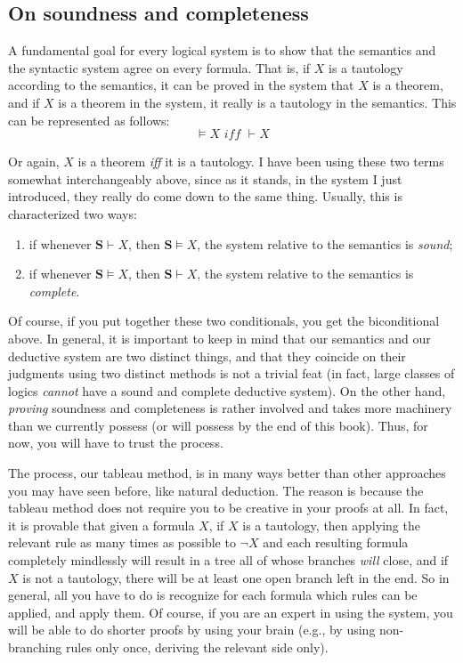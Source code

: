 \subsection{On soundness and completeness}

A fundamental goal for every logical system is to show that the semantics and the syntactic system agree on every formula. That is, if $X$ is a tautology according to the semantics, it can be proved in the system that $X$ is a theorem, and if $X$ is a theorem in the system, it really is a tautology in the semantics. This can be represented as follows: 
\[\models X \textit{ iff } \vdash X\]

Or again, $X$ is a theorem \textit{iff} it is a tautology. I have been using these two terms somewhat interchangeably above, since as it stands, in the system I just introduced, they really do come down to the same thing. Usually, this is characterized two ways:

\begin{enumerate}
	\item if whenever $\mathbf{S} \vdash X$, then $\mathbf{S} \models X$, the system relative to the semantics is \textit{sound};
	\item if whenever $\mathbf{S} \models X$, then $\mathbf{S} \vdash X$, the system relative to the semantics is \textit{complete}. 
\end{enumerate}

Of course, if you put together these two conditionals, you get the biconditional above. In general, it is important to keep in mind that our semantics and our deductive system are two distinct things, and that they coincide on their judgments using two distinct methods is not a trivial feat (in fact, large classes of logics \textit{cannot} have a sound and complete deductive system). On the other hand, \textit{proving} soundness and completeness is rather involved and takes more machinery than we currently possess (or will possess by the end of this book). Thus, for now, you will have to trust the process. 

The process, our tableau method, is in many ways better than other approaches you may have seen before, like natural deduction. The reason is because the tableau method does not require you to be creative in your proofs at all. In fact, it is provable that given a formula $X$, if $X$ is a tautology, then applying the relevant rule as many times as possible to $ \neg X$ and each resulting formula completely mindlessly will result in a tree all of whose branches \textit{will} close, and if $X$ is not a tautology, there will be at least one open branch left in the end. So in general, all you have to do is recognize for each formula which rules can be applied, and apply them. Of course, if you are an expert in using the system, you will be able to do shorter proofs by using your brain (e.g., by using non-branching rules only once, deriving the relevant side only). 

